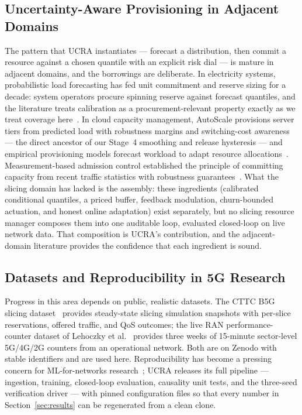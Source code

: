 \subsection{Uncertainty-Aware Provisioning in Adjacent Domains}

The pattern that UCRA instantiates --- forecast a distribution, then
commit a resource against a chosen quantile with an explicit risk
dial --- is mature in adjacent domains, and the borrowings are
deliberate. In electricity systems, probabilistic load forecasting
has fed unit commitment and reserve sizing for a decade: system
operators procure spinning reserve against forecast quantiles, and
the literature treats calibration as a procurement-relevant property
exactly as we treat coverage here~\cite{hong2016probabilistic}. In
cloud capacity management, AutoScale provisions server tiers from
predicted load with robustness margins and switching-cost
awareness~\cite{gandhi2012autoscale} --- the direct ancestor of our
Stage~4 smoothing and release hysteresis --- and empirical
provisioning models forecast workload to adapt resource
allocations~\cite{islam2012provisioning}. Measurement-based admission
control established the principle of committing capacity from
recent traffic statistics with robustness
guarantees~\cite{grossglauser1999adaptive}. What the slicing domain
has lacked is the assembly: these ingredients (calibrated
conditional quantiles, a priced buffer, feedback modulation,
churn-bounded actuation, and honest online adaptation) exist
separately, but no slicing resource manager composes them into one
auditable loop, evaluated closed-loop on live network data. That
composition is UCRA's contribution, and the adjacent-domain
literature provides the confidence that each ingredient is sound.

\subsection{Datasets and Reproducibility in 5G Research}

Progress in this area depends on public, realistic datasets. The CTTC
B5G slicing dataset~\cite{farreras2024cttc} provides steady-state
slicing simulation snapshots with per-slice reservations, offered
traffic, and QoS outcomes; the live RAN performance-counter
dataset of Lehoczky et al.~\cite{lehoczky2026ran} provides three
weeks of 15-minute sector-level 5G/4G/2G counters from an operational
network. Both are on Zenodo with stable identifiers and are used
here. Reproducibility has become a pressing concern for ML-for-networks
research~\cite{pineau2021improving}; UCRA releases its full pipeline
--- ingestion, training, closed-loop evaluation, causality unit
tests, and the three-seed verification driver --- with pinned
configuration files so that every number in Section~\ref{sec:results}
can be regenerated from a clean clone.
